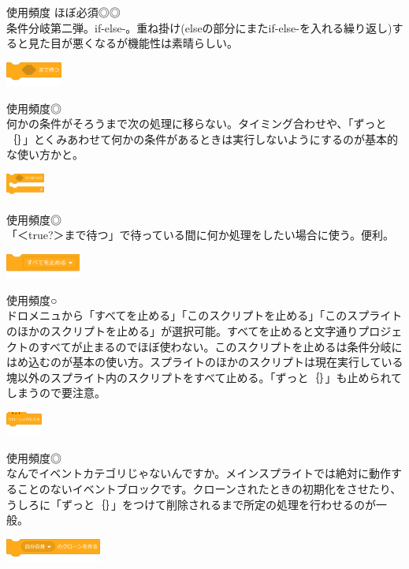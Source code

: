\documentclass[b5paper,10pt]{jsarticle}
\begin{document}
\begin{multicols*}{3}
\begin{itembox}{5}
\end{itembox}
使用頻度 ほぼ必須◎◎\\
条件分岐第二弾。if-else-。重ね掛け(elseの部分にまたif-else-を入れる繰り返し)すると見た目が悪くなるが機能性は素晴らしい。
\begin{itembox}{6}
\includegraphics[height=8mm]{images/control_6.png}
\end{itembox}
使用頻度◎\\
何かの条件がそろうまで次の処理に移らない。タイミング合わせや、「ずっと｛｝」とくみあわせて何かの条件があるときは実行しないようにするのが基本的な使い方かと。
\begin{itembox}{7}
\includegraphics[height=8mm]{images/control_7.png}
\end{itembox}
使用頻度◎\\
「＜true?＞まで待つ」で待っている間に何か処理をしたい場合に使う。便利。
\begin{itembox}{8}
\includegraphics[height=8mm]{images/control_8.png}
\end{itembox}
使用頻度○\\
ドロメニュから「すべてを止める」「このスクリプトを止める」「このスプライトのほかのスクリプトを止める」が選択可能。すべてを止めると文字通りプロジェクトのすべてが止まるのでほぼ使わない。このスクリプトを止めるは条件分岐にはめ込むのが基本の使い方。スプライトのほかのスクリプトは現在実行している塊以外のスプライト内のスクリプトをすべて止める。「ずっと｛｝」も止められてしまうので要注意。
\begin{itembox}{9}
\includegraphics[height=8mm]{images/control_9.png}
\end{itembox}
使用頻度◎\\
なんでイベントカテゴリじゃないんですか。メインスプライトでは絶対に動作することのないイベントブロックです。クローンされたときの初期化をさせたり、うしろに「ずっと｛｝」をつけて削除されるまで所定の処理を行わせるのが一般。
\begin{itembox}{10}
\includegraphics[height=8mm]{images/control_10.png}

\end{itembox}
\end{multicols*}
\end{document}
